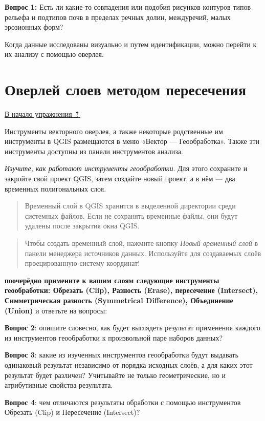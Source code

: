 \documentclass[
  12pt,
]{book}
\begin{document}
\textbf{Вопрос 1:} Есть ли какие-то совпадения или подобия рисунков контуров типов рельефа и подтипов почв в пределах речных долин, междуречий, малых эрозионных форм?

Когда данные исследованы визуально и путем идентификации, можно перейти к их анализу с помощью оверлея.

\hypertarget{overlay-intersect}{%
\section{Оверлей слоев методом пересечения}\label{overlay-intersect}}

\protect\hyperlink{overlay}{В начало упражнения ⇡}

Инструменты векторного оверлея, а также некоторые родственные им инструменты в QGIS размещаются в меню «Вектор --- Геообработка». Также эти инструменты доступны из панели инструментов анализа.

\emph{Изучите, как работают инструменты геообработки}. Для этого сохраните и закройте свой проект QGIS, затем создайте новый проект, а в нём --- два временных полигональных слоя.

\begin{quote}
Временный слой в QGIS хранится в выделенной директории среди системных файлов. Если не сохранять временные файлы, они будут удалены после закрытия окна QGIS.
\end{quote}

\begin{quote}
Чтобы создать временный слой, нажмите кнопку \emph{Новый временный слой} в панели менеджера источников данных. Используйте для создаваемых слоёв проецированную систему координат!
\end{quote}

\textbf{поочерёдно примените к вашим слоям следующие инструменты геообработки: Обрезать (Clip), Разность (Erase), пересечение (Intersect), Симметрическая разность (Symmetrical Difference), Объединение (Union)} и ответьте на вопросы:

\textbf{Вопрос 2}: опишите словесно, как будет выглядеть результат применения каждого из инструментов геообработки к произвольной паре наборов данных?

\textbf{Вопрос 3}: какие из изученных инструментов геообработки будут выдавать одинаковый результат независимо от порядка исходных слоёв, а для каких этот результат будет различен? Учитывайте не только геометрические, но и атрибутивные свойства результата.

\textbf{Вопрос 4}: чем отличаются результаты обработки с помощью инструментов Обрезать (Clip) и Пересечение (Intersect)?
\end{document}
